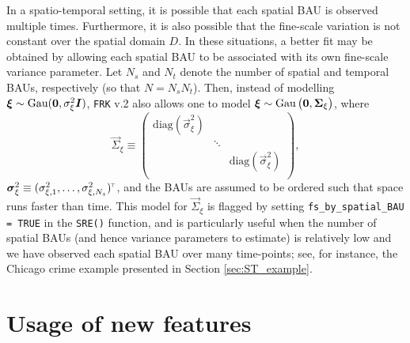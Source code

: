 \documentclass[12pt,a4paper]{article}
\begin{document}
In a spatio-temporal setting, it is possible that each spatial BAU is observed multiple times. 
Furthermore, it is also possible that the fine-scale variation is not constant over the spatial domain $D$. 
In these situations, a better fit may be obtained by allowing each spatial BAU to be associated with its own fine-scale variance parameter. 
Let $N_s$ and $N_t$ denote the number of spatial and temporal BAUs, respectively (so that $N = N_sN_t$).
Then, instead of modelling $\vec{\xi} \sim \Gau(\vec{0}, \sigma^2_\xi \vec{I})$, \texttt{FRK} v.2 also allows one to model
$\vec{\xi} \sim \Gau\left(\vec{0}, \vec{\Sigma}_\xi\right)$,
where 
\begin{equation}
    \vec{\Sigma}_\xi \equiv
\begin{pmatrix}
\text{diag}(\vec{\sigma}^2_\xi) & & \\
&  \ddots  & \\
&    & \text{diag}(\vec{\sigma}^2_\xi)\\
\end{pmatrix},
\end{equation}
$\vec{\sigma}^2_\xi \equiv (\sigma^2_{\xi, 1}, \dots, \sigma^2_{\xi, N_s})^\tp$,
and the BAUs are assumed to be ordered such that space runs faster than time. 
This model for $\vec{\Sigma}_\xi$ is flagged by setting \texttt{fs\_by\_spatial\_BAU = TRUE} in the \texttt{SRE()} function, and is particularly useful when the number of spatial BAUs (and hence variance parameters to estimate) is relatively low and we have observed each spatial BAU over many time-points; see, for instance, the Chicago crime example presented in Section \ref{sec:ST_example}. 


\section{Usage of new features}\label{SEC:IllustrativeExample}

\end{document}
